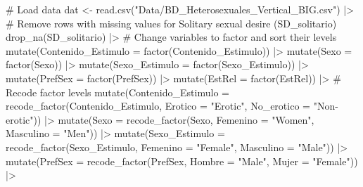 \documentclass[
  bookmarksnumbered]{article}
\newenvironment{Shaded}{\begin{snugshade}}{\end{snugshade}}
\newcommand{\AttributeTok}[1]{\textcolor[rgb]{0.80,0.80,0.80}{#1}}
\newcommand{\CommentTok}[1]{\textcolor[rgb]{0.50,0.62,0.50}{#1}}
\newcommand{\FunctionTok}[1]{\textcolor[rgb]{0.94,0.94,0.56}{#1}}
\newcommand{\NormalTok}[1]{\textcolor[rgb]{0.80,0.80,0.80}{#1}}
\newcommand{\OtherTok}[1]{\textcolor[rgb]{0.94,0.94,0.56}{#1}}
\newcommand{\SpecialCharTok}[1]{\textcolor[rgb]{0.86,0.64,0.64}{#1}}
\newcommand{\StringTok}[1]{\textcolor[rgb]{0.80,0.58,0.58}{#1}}
\begin{document}
\begin{Shaded}
\begin{Highlighting}[]
\CommentTok{\# Load data}
\NormalTok{dat }\OtherTok{\textless{}{-}} \FunctionTok{read.csv}\NormalTok{(}\StringTok{"Data/BD\_Heterosexuales\_Vertical\_BIG.csv"}\NormalTok{) }\SpecialCharTok{|\textgreater{}}
  \CommentTok{\# Remove rows with missing values for Solitary sexual desire (SD\_solitario)}
  \FunctionTok{drop\_na}\NormalTok{(SD\_solitario) }\SpecialCharTok{|\textgreater{}} 
  \CommentTok{\# Change variables to factor and sort their levels}
  \FunctionTok{mutate}\NormalTok{(}\AttributeTok{Contenido\_Estimulo =} \FunctionTok{factor}\NormalTok{(Contenido\_Estimulo)) }\SpecialCharTok{|\textgreater{}} 
  \FunctionTok{mutate}\NormalTok{(}\AttributeTok{Sexo =} \FunctionTok{factor}\NormalTok{(Sexo)) }\SpecialCharTok{|\textgreater{}}
  \FunctionTok{mutate}\NormalTok{(}\AttributeTok{Sexo\_Estimulo =} \FunctionTok{factor}\NormalTok{(Sexo\_Estimulo)) }\SpecialCharTok{|\textgreater{}}
  \FunctionTok{mutate}\NormalTok{(}\AttributeTok{PrefSex =} \FunctionTok{factor}\NormalTok{(PrefSex)) }\SpecialCharTok{|\textgreater{}}
  \FunctionTok{mutate}\NormalTok{(}\AttributeTok{EstRel =} \FunctionTok{factor}\NormalTok{(EstRel)) }\SpecialCharTok{|\textgreater{}}
  \CommentTok{\# Recode factor levels}
  \FunctionTok{mutate}\NormalTok{(}\AttributeTok{Contenido\_Estimulo =} \FunctionTok{recode\_factor}\NormalTok{(Contenido\_Estimulo, }
                                            \AttributeTok{Erotico =} \StringTok{"Erotic"}\NormalTok{, }
                                            \AttributeTok{No\_erotico =} \StringTok{"Non{-}erotic"}\NormalTok{)) }\SpecialCharTok{|\textgreater{}} 
  \FunctionTok{mutate}\NormalTok{(}\AttributeTok{Sexo =} \FunctionTok{recode\_factor}\NormalTok{(Sexo, }
                              \AttributeTok{Femenino =} \StringTok{"Women"}\NormalTok{, }
                              \AttributeTok{Masculino =} \StringTok{"Men"}\NormalTok{)) }\SpecialCharTok{|\textgreater{}}
  \FunctionTok{mutate}\NormalTok{(}\AttributeTok{Sexo\_Estimulo =} \FunctionTok{recode\_factor}\NormalTok{(Sexo\_Estimulo,}
                                       \AttributeTok{Femenino =} \StringTok{"Female"}\NormalTok{, }
                                       \AttributeTok{Masculino =} \StringTok{"Male"}\NormalTok{)) }\SpecialCharTok{|\textgreater{}}
  \FunctionTok{mutate}\NormalTok{(}\AttributeTok{PrefSex =} \FunctionTok{recode\_factor}\NormalTok{(PrefSex, }
                                 \AttributeTok{Hombre =} \StringTok{"Male"}\NormalTok{, }
                                 \AttributeTok{Mujer =} \StringTok{"Female"}\NormalTok{)) }\SpecialCharTok{|\textgreater{}}

\end{Highlighting}
\end{Shaded}
\end{document}
